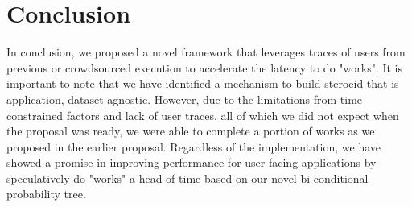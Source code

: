 \section{Conclusion}
\label{sec:conc}
In conclusion, we proposed a novel framework that leverages traces of users from
previous or crowdsourced execution to accelerate the latency to do "works". It
is important to note that we have identified a mechanism to build steroeid that
is application, dataset agnostic. However,  due to the limitations from time
constrained factors and lack of user traces, all of which we did not expect when
the proposal was ready, we were able to complete a portion of works as we
proposed in the earlier proposal.
Regardless of the implementation, we have showed a promise in improving
performance for user-facing applications by speculatively do "works" a head of
time based on our novel bi-conditional probability tree. 
